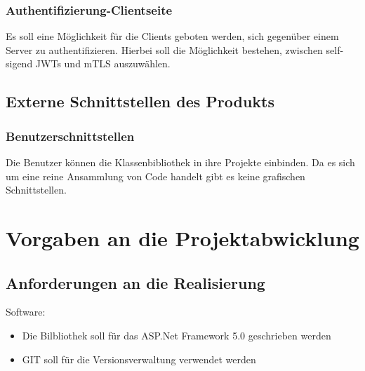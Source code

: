 \documentclass[14pt,a4paper]{extarticle}
\begin{document}
	\subsubsection{Authentifizierung-Clientseite}
	Es soll eine Möglichkeit für die Clients geboten werden, sich gegenüber einem Server zu authentifizieren.
	Hierbei soll die Möglichkeit bestehen, zwischen self-sigend JWTs und mTLS auszuwählen.

	\subsection{Externe Schnittstellen des Produkts}

	\subsubsection{Benutzerschnittstellen}
	Die Benutzer können die Klassenbibliothek in ihre Projekte einbinden.
	Da es sich um eine reine Ansammlung von Code handelt gibt es keine grafischen Schnittstellen.

	\section{Vorgaben an die Projektabwicklung}
	\subsection{Anforderungen an die Realisierung}
	Software:
	\begin{itemize}
		\item Die Bilbliothek soll für das ASP.Net Framework 5.0 geschrieben werden
		\item GIT soll für die Versionsverwaltung verwendet werden
	\end{itemize}
\end{document}
